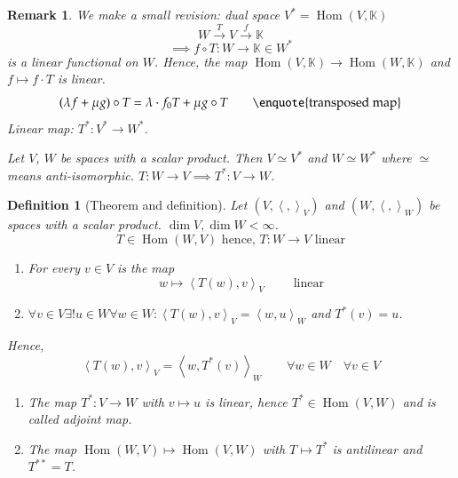 \documentclass{article}
\newtheorem{definition}{Definition}  \numberwithin{definition}{section}
\newtheorem{remark}{Remark}  \numberwithin{remark}{section}
\newcommand{\ip}[2]{\left\langle#1,#2\right\rangle} %
\begin{document}
\begin{remark}
  We make a small revision: dual space $V^* = \operatorname{Hom}(V, \mathbb K)$
  \[ W \xrightarrow{T} V \xrightarrow{f} \mathbb K \]
  \[ \implies f \circ T: W \to \mathbb K \in W^* \]
  is a linear functional on $W$.
  Hence, the map $\operatorname{Hom}(V, \mathbb K) \to \operatorname{Hom}(W, \mathbb K)$ and $f \mapsto f \cdot T$ is linear.
  \[ (\lambda f + \mu g) \circ T = \lambda \cdot f_0 T + \mu g \circ T \qquad \text{\enquote{transposed map}} \]
  Linear map: $T^*: V^* \to W^*$.

  Let $V$, $W$ be spaces with a scalar product. Then $V \simeq V^*$ and $W \simeq W^*$ where $\simeq$ means anti-isomorphic.
  $T: W \to V \implies T^*: V \to W$.
\end{remark}

\begin{definition}[Theorem and definition] %
  \label{def863}
  Let $(V, \ip{}{}_V)$ and $(W, \ip{}{}_W)$ be spaces with a scalar product. $\dim{V}, \dim{W} < \infty$.
  \[ T \in \operatorname{Hom}(W, V) \text{ hence, } T: W \to V \text{ linear} \]
  \begin{enumerate}
    \item For every $v \in V$ is the map
      \[ w \mapsto \ip{T(w)}{v}_V \qquad \text{ linear} \]
    \item $\forall v \in V \exists! u \in W \forall w \in W: \ip{T(w)}{v}_V = \ip{w}{u}_W$ and $T^*(v) = u$.
  \end{enumerate}
  Hence,
  \[ \ip{T(w)}{v}_V = \ip{w}{T^*(v)}_W \qquad \forall w \in W \quad \forall v \in V \]
  \begin{enumerate}
    \item[3.] The map $T^*: V \to W$ with $v \mapsto u$ is linear, hence $T^* \in \operatorname{Hom}(V, W)$ and is called \emph{adjoint map}.
    \item[4.] The map $\operatorname{Hom}(W, V) \mapsto \operatorname{Hom}(V, W)$ with $T \mapsto T^*$ is antilinear and $T^{**} = T$.
  \end{enumerate}
\end{definition}
\end{document}
